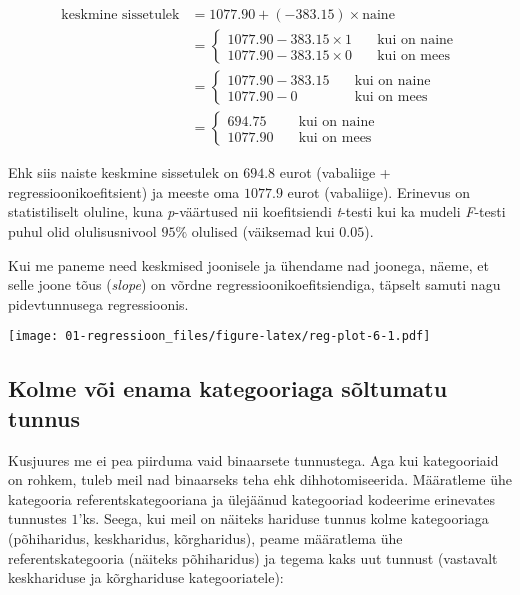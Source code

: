 \documentclass[
]{book}
\begin{document}
\begin{align}
\text{keskmine sissetulek}&=1077.90+(-383.15)\times \text{naine}\\
&=
  \begin{cases}
    1077.90-383.15\times 1 & \quad \text{kui on naine}\\
    1077.90-383.15\times 0 & \quad \text{kui on mees}
  \end{cases}\\
&=
  \begin{cases}
    1077.90-383.15 & \quad \text{kui on naine}\\
    1077.90-0 & \quad \text{kui on mees}
  \end{cases}\\
&=
  \begin{cases}
    694.75 & \quad \text{kui on naine}\\
    1077.90 & \quad \text{kui on mees}
  \end{cases}
\end{align}

Ehk siis naiste keskmine sissetulek on \(694.8\) eurot (vabaliige + regressioonikoefitsient) ja meeste oma \(1077.9\) eurot (vabaliige). Erinevus on statistiliselt oluline, kuna \emph{p}-väärtused nii koefitsiendi \emph{t}-testi kui ka mudeli \emph{F}-testi puhul olid olulisusnivool \(95\%\) olulised (väiksemad kui \(0.05\)).

Kui me paneme need keskmised joonisele ja ühendame nad joonega, näeme, et selle joone tõus (\emph{slope}) on võrdne regressioonikoefitsiendiga, täpselt samuti nagu pidevtunnusega regressioonis.

\texttt{[image: 01-regressioon\_files/figure-latex/reg-plot-6-1.pdf]}

\hypertarget{kolme-vuxf5i-enama-kategooriaga-suxf5ltumatu-tunnus}{%
\subsection{Kolme või enama kategooriaga sõltumatu tunnus}\label{kolme-vuxf5i-enama-kategooriaga-suxf5ltumatu-tunnus}}

Kusjuures me ei pea piirduma vaid binaarsete tunnustega. Aga kui kategooriaid on rohkem, tuleb meil nad binaarseks teha ehk dihhotomiseerida. Määratleme ühe kategooria referentskategooriana ja ülejäänud kategooriad kodeerime erinevates tunnustes \(1\)'ks. Seega, kui meil on näiteks hariduse tunnus kolme kategooriaga (põhiharidus, keskharidus, kõrgharidus), peame määratlema ühe referentskategooria (näiteks põhiharidus) ja tegema kaks uut tunnust (vastavalt keskhariduse ja kõrghariduse kategooriatele):
\end{document}
